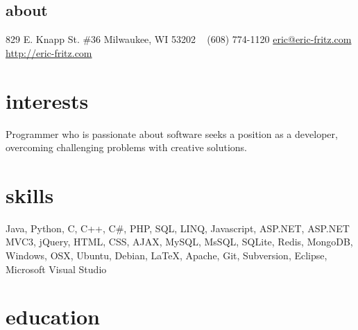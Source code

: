 \documentclass[]{fritz-resume}
\begin{document}


\begin{aside}
  \section{about}
    829 E. Knapp St. \#36
    Milwaukee, WI 53202
    ~
    (608) 774-1120
    \href{mailto:eric@eric-fritz.com?subject=Resume}{eric@eric-fritz.com}
    \href{http://eric-fritz.com}{http://eric-fritz.com}
\end{aside}


\section{interests}

{\small Programmer who is passionate about software seeks a position as a developer, overcoming challenging problems with creative solutions.}


\section{skills}

{\small Java, Python, C, C++, C\#, PHP, SQL, LINQ, Javascript, ASP.NET, ASP.NET MVC3, jQuery, HTML, CSS, AJAX, MySQL, MsSQL, SQLite, Redis, MongoDB, Windows, OSX, Ubuntu, Debian, \LaTeX{}, Apache, Git, Subversion, Eclipse, Microsoft Visual Studio}


\section{education}
\end{document}
